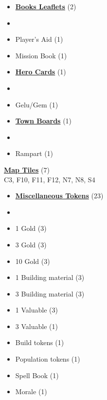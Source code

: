 

\begin{multicols*}{3}

\footnotesize

\begin{itemize}[leftmargin=0pt, label={}, noitemsep]
  \item \textbf{\normalsize{\underline{Books Leaflets}}} (2)
  \item
  \item Player's Aid (1)
  \item Mission Book (1)
\end{itemize}

\begin{itemize}[leftmargin=0pt, label={}, noitemsep]
  \item \textbf{\normalsize{\underline{Hero Cards}}} (1)
  \item
  \item Gelu/Gem (1)
\end{itemize}

\begin{itemize}[leftmargin=0pt, label={}, noitemsep]
  \item \textbf{\normalsize{\underline{Town Boards}}} (1)
  \item
  \item Rampart (1)
\end{itemize}

\textbf{\normalsize{\underline{Map Tiles}}} (7)\\

C3, F10, F11, F12, N7, N8, S4

\begin{itemize}[leftmargin=0pt, label={}, noitemsep]
  \item \textbf{\normalsize{\underline{Miscellaneous Tokens}}} (23)
  \item
  \item 1 Gold (3)
  \item 3 Gold (3)
  \item 10 Gold (3)
  \item 1 Building material (3)
  \item 3 Building material (3)
  \item 1 Valuable (3)
  \item 3 Valuable (1)
  \item Build tokens (1)
  \item Population tokens (1)
  \item Spell Book (1)
  \item Morale (1)
\end{itemize}


\end{multicols*}
